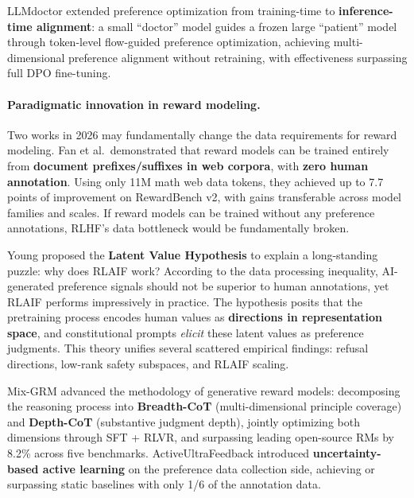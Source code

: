 LLMdoctor \cite{llmdoctor2026} extended preference optimization
from training-time to \textbf{inference-time alignment}:
a small ``doctor'' model guides a frozen large ``patient'' model
through token-level flow-guided preference optimization,
achieving multi-dimensional preference alignment without retraining,
with effectiveness surpassing full DPO fine-tuning.

\paragraph{Paradigmatic innovation in reward modeling.}
Two works in 2026 may fundamentally change the data requirements for reward modeling.
 Fan et al.\ demonstrated that
reward models can be trained entirely from \textbf{document prefixes/suffixes in web corpora},
with \textbf{zero human annotation}.
Using only 11M math web data tokens,
they achieved up to 7.7 points of improvement on RewardBench v2,
with gains transferable across model families and scales.
If reward models can be trained without any preference annotations,
RLHF's data bottleneck would be fundamentally broken.

 Young proposed the \textbf{Latent Value Hypothesis}
to explain a long-standing puzzle: why does RLAIF work?
According to the data processing inequality, AI-generated preference signals should not be superior to human annotations,
yet RLAIF performs impressively in practice.
The hypothesis posits that the pretraining process encodes human values as \textbf{directions in representation space},
and constitutional prompts \emph{elicit} these latent values as preference judgments.
This theory unifies several scattered empirical findings:
refusal directions, low-rank safety subspaces, and RLAIF scaling.

Mix-GRM \cite{mixgrm2026} advanced the methodology of generative reward models:
decomposing the reasoning process into \textbf{Breadth-CoT} (multi-dimensional principle coverage)
and \textbf{Depth-CoT} (substantive judgment depth),
jointly optimizing both dimensions through SFT + RLVR,
and surpassing leading open-source RMs by 8.2\% across five benchmarks.
ActiveUltraFeedback \cite{melikidze2026activeuf}
introduced \textbf{uncertainty-based active learning} on the preference data collection side,
achieving or surpassing static baselines with only 1/6 of the annotation data.


